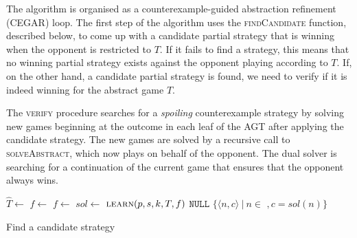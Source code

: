 The algorithm is organised as a counterexample-guided abstraction refinement (CEGAR) loop.  The first step of the algorithm uses the \textsc{findCandidate} function, described below, to come up with a candidate partial strategy that is winning when the opponent is restricted to $T$.  If it fails to find a strategy, this means that no winning partial strategy exists against the opponent playing according to $T$.  If, on the other hand, a candidate partial strategy is found, we need to verify if it is indeed winning for the abstract game $T$.

The \textsc{verify} procedure searches for a \emph{spoiling} counterexample strategy by solving new games beginning at the outcome in each leaf of the AGT after applying the candidate strategy. The new games are solved by a recursive call to \textsc{solveAbstract}, which now plays on behalf of the opponent. The dual solver is searching for a continuation of the current game that ensures that the opponent always wins.

\begin{algorithm}
    \begin{algorithmic}
        \State $\hat{T} \gets $  \label{line:extend}
                \State $f \gets $ 
            \Else
                \State $f \gets $ 
            \EndIf
            \State $sol \gets $ 
                \State $\Call{learn}{p, s, k, T, f}$\label{line:boundedLearning}
                \State \Return $\texttt{NULL}$ 
            \Else
                \State \Return $\{ \langle n, c \rangle\ |\ n \in $ $, c = sol(n) \}$
            \EndIf
        \EndFunction
    \end{algorithmic}
    \caption{Find a candidate strategy}
    \label{alg:findcandidate}
\end{algorithm}


